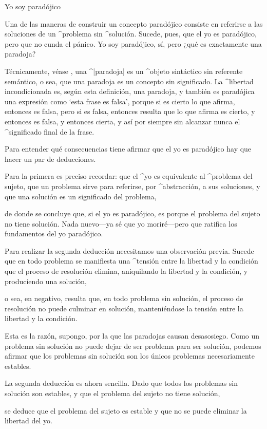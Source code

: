 \Section Yo soy paradójico

Una de las maneras de construir un concepto paradójico consiste en
referirse a las soluciones de un ^{problema} sin ^{solución}. Sucede,
pues, que el yo es paradójico, pero que no cunda el pánico. Yo soy
paradójico, sí, pero ¿qué es exactamente una paradoja?

Técnicamente, véase , una ^|paradoja| es un ^{objeto}
sintáctico sin referente semántico, o sea, que una paradoja es un
concepto sin significado. La ^{libertad} incondicionada es, según esta
definición, una paradoja, y también es paradójica una expresión como
`esta frase es falsa', porque si es cierto lo que afirma, entonces es
falsa, pero si es falsa, entonces resulta que lo que afirma es cierto, y
entonces es falsa, y entonces cierta, y así por siempre sin alcanzar
nunca el ^{significado} final de la frase.

Para entender qué consecuencias tiene afirmar que el yo es paradójico
hay que hacer un par de deducciones.

Para la primera es preciso recordar:
\point que el ^{yo} es equivalente al ^{problema del sujeto},
\point que un problema sirve para referirse, por ^{abstracción},
       a sus soluciones, y
\point que una solución es un significado del problema,
\par\noindent de donde se concluye que, si el yo es paradójico, es
porque el problema del sujeto no tiene solución. Nada nuevo---ya sé que
yo moriré---pero que ratifica los fundamentos del yo paradójico.

Para realizar la segunda deducción necesitamos una observación previa.
Sucede
\point que en todo problema se manifiesta una ^{tensión} entre la
libertad y la condición que el proceso de resolución elimina,
aniquilando la libertad y la condición, y produciendo una solución,
\par\noindent o sea, en negativo, resulta
\point que, en todo problema sin solución, el proceso de resolución no
puede culminar en solución, manteniéndose la tensión entre la libertad y
la condición.
\par\noindent Esta es la razón, supongo, por la que las paradojas causan
desasosiego. Como un problema sin solución no puede dejar de ser
problema para ser solución, podemos afirmar que los problemas sin
solución son los únicos problemas necesariamente estables.

La segunda deducción es ahora sencilla. Dado
\point que todos los problemas sin solución son estables, y
\point que el problema del sujeto no tiene solución,
\par\noindent se deduce que el problema del sujeto es estable y
que no se puede eliminar la libertad del yo.

